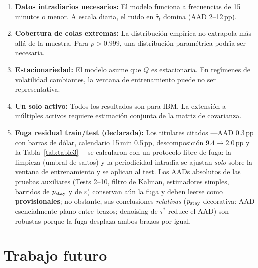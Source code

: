 \begin{enumerate}
    \item \textbf{Datos intradiarios necesarios:} El modelo funciona a frecuencias
    de 15 minutos o menor. A escala diaria, el ruido en $\hat{\tau}_t$ domina
    (AAD 2--12\,pp).

    \item \textbf{Cobertura de colas extremas:} La distribuci\'{o}n emp\'{\'i}rica
    no extrapola m\'{a}s all\'{a} de la muestra. Para $p > 0.999$, una
    distribuci\'{o}n param\'{e}trica podr\'{\'i}a ser necesaria.

    \item \textbf{Estacionariedad:} El modelo asume que $Q$ es estacionaria. En
    reg\'{\'i}menes de volatilidad cambiantes, la ventana de entrenamiento puede
    no ser representativa.

    \item \textbf{Un solo activo:} Todos los resultados son para IBM. La
    extensi\'{o}n a m\'{u}ltiples activos requiere estimaci\'{o}n conjunta de la
    matriz de covarianza.

    \item \textbf{Fuga residual train/test (declarada):} Los titulares citados
    ---AAD 0.3\,pp con barras de d\'{o}lar, calendario 15\,min 0.5\,pp, descomposici\'{o}n
    $9.4 \to 2.0$\,pp y la Tabla~\ref{tab:table3}--- se calcularon con un protocolo
    libre de fuga: la limpieza (umbral de saltos) y la periodicidad intrad\'{\'i}a se
    ajustan \emph{solo} sobre la ventana de entrenamiento y se aplican al test. Los
    AADs absolutos de las pruebas auxiliares (Tests 2--10, filtro de Kalman,
    estimadores simples, barridos de $p_{\text{stay}}$ y de $\varepsilon$) conservan a\'{u}n la
    fuga y deben leerse como \textbf{provisionales}; no obstante, sus conclusiones
    \emph{relativas} ($p_{\text{stay}}$ decorativa: AAD esencialmente plano entre brazos;
    denoising de $\tau^*$ reduce el AAD) son robustas porque la fuga desplaza ambos
    brazos por igual.
\end{enumerate}

\section{Trabajo futuro}

